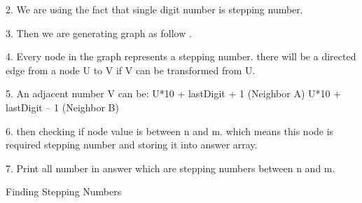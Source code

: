 \documentclass[conference]{IEEEtran}
\begin{document}
2. We are using the fact that single digit number is stepping number.

3. Then we are generating graph as follow .

4. Every node in the graph represents a stepping number. there will be a directed edge from a node U to V if V can be transformed from U.

5. An adjacent number V can be:  
U*10 + lastDigit + 1 (Neighbor A)
U*10 + lastDigit – 1 (Neighbor B)

6. then checking if node value is between n and m. which means this node is required stepping number and storing it into answer array.

7. Print all number in answer which are stepping numbers between n and m.


\newline
\begin{algorithm}
    \caption{Finding Stepping Numbers}
    \DontPrintSemicolon
\end{algorithm}
\end{document}
